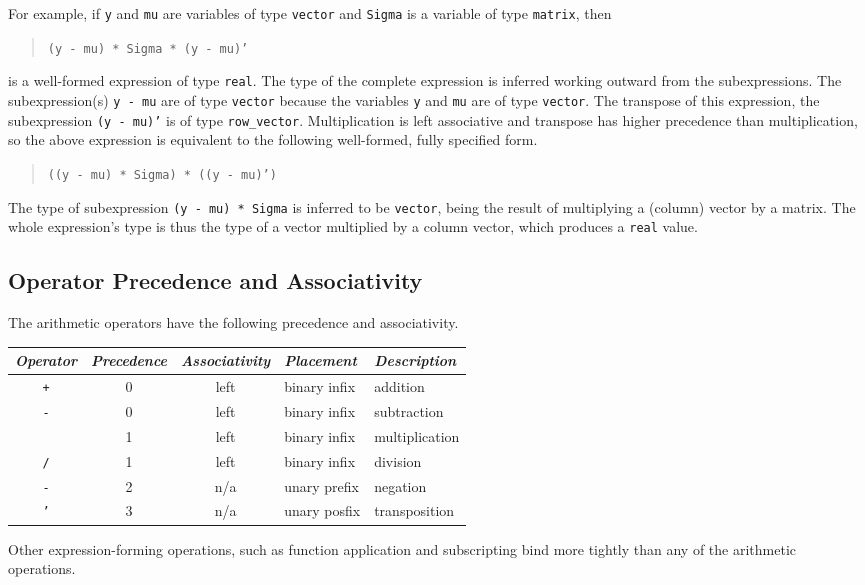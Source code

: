 \documentclass[10pt]{report}
\newcommand{\code}[1]{{\tt #1}}
\begin{document}
For example, if \code{y} and \code{mu} are variables of type
\code{vector} and \code{Sigma} is a variable of type \code{matrix},
then
%
\begin{quote}
\code{(y - mu) * Sigma * (y - mu)'}
\end{quote}
%
is a well-formed expression of type \code{real}.  The type of the
complete expression is inferred working outward from the
subexpressions.  The subexpression(s) \code{y - mu} are of type
\code{vector} because the variables \code{y} and \code{mu} are of type
\code{vector}.  The transpose of this expression, the subexpression
\code{(y - mu)'} is of type \code{row\_vector}.  Multiplication is
left associative and transpose has higher precedence than
multiplication, so the above expression is equivalent to the following
well-formed, fully specified form.
%
\begin{quote}
\code{((y - mu) * Sigma) * ((y - mu)')}
\end{quote}
%
The type of subexpression \code{(y - mu) * Sigma} is inferred to be
\code{vector}, being the result of multiplying a (column) vector by a
matrix.  The whole expression's type is thus the type of a vector
multiplied by a column vector, which produces a \code{real} value.



\subsection{Operator Precedence and Associativity}

The arithmetic operators have the following precedence and
associativity.
%
\begin{center}
\begin{tabular}{c|ccl|l}
{\it Operator} & {\it Precedence} & {\it Associativity} & {\it
  Placement} & {\it Description}
\\ \hline \hline
\code{+} & 0 & left & binary infix & addition
\\
\code{-} & 0 & left & binary infix & subtraction
\\ \hline
\code{*} & 1 & left & binary infix & multiplication
\\
\code{/} & 1 & left & binary infix & division
\\ \hline
\code{-} & 2 & n/a & unary prefix & negation
\\ \hline
\code{'} & 3 & n/a & unary posfix & transposition
\end{tabular}
\end{center}
%
Other expression-forming operations, such as function application and
subscripting bind more tightly than any of the arithmetic operations.  
\end{document}
